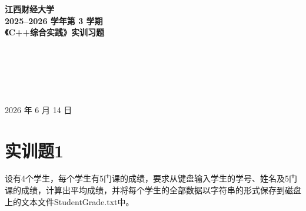 \documentclass[12pt,a4paper]{article}
\begin{document}
\thispagestyle{empty}
\begin{center}


    {\Huge \textbf{江西财经大学}}\\[1cm]
    {\Large \textbf{2025–2026 学年第 3 学期}}\\[1cm]
    {\LARGE \textbf{《C++综合实践》实训习题}}\\[2cm]

    \vspace{3cm}
{
\underline{}\quad {}\underline{}\\[0.5cm]
\underline{}\quad {}\underline{}\\[0.5cm]
\underline{}\quad {}\underline{}\\[0.5cm]

\quad\underline{}\\[0.5cm]
\quad\underline{}\\[0.5cm]
}

    \vspace{2cm}
    {\large 2026 年 6 月 14 日}
\end{center}

\newpage


\section*{实训题1}
设有4个学生，每个学生有5门课的成绩，要求从键盘输入学生的学号、姓名及5门课的成绩，计算出平均成绩，并将每个学生的全部数据以字符串的形式保存到磁盘上的文本文件StudentGrade.txt中。
\end{document}
